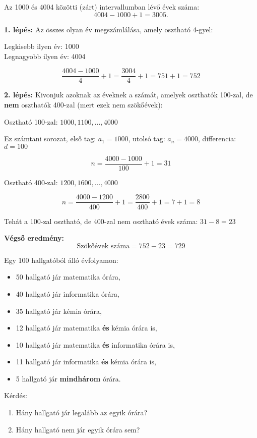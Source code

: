 \begin{solution}
Az 1000 és 4004 közötti (zárt) intervallumban lévő évek száma: 
\[
4004-1000+1=3005.
\]

\medskip{}

\textbf{1. lépés:} Az összes olyan év megszámlálása, amely osztható
4-gyel:

Legkisebb ilyen év: 1000 \\
 Legnagyobb ilyen év: 4004

\[
\frac{4004-1000}{4}+1=\frac{3004}{4}+1=751+1=752
\]

\textbf{2. lépés:} Kivonjuk azoknak az éveknek a számát, amelyek oszthatók
100-zal, de \textbf{nem} oszthatók 400-zal (mert ezek nem szökőévek):

Osztható 100-zal: $1000,1100,\dots,4000$

Ez számtani sorozat, első tag: $a_{1}=1000$, utolsó tag: $a_{n}=4000$,
differencia: $d=100$

\[
n=\frac{4000-1000}{100}+1=31
\]

Osztható 400-zal: $1200,1600,\dots,4000$

\[
n=\frac{4000-1200}{400}+1=\frac{2800}{400}+1=7+1=8
\]

Tehát a 100-zal osztható, de 400-zal nem osztható évek száma: $31-8=23$

\medskip{}

\textbf{Végső eredmény:} 
\[
\text{Szökőévek száma}=752-23=\boxed{729}
\]
\end{solution}
\begin{extraproblem}
Egy 100 hallgatóból álló évfolyamon:
\begin{itemize}
\item 50 hallgató jár matematika órára, 
\item 40 hallgató jár informatika órára, 
\item 35 hallgató jár kémia órára, 
\item 12 hallgató jár matematika \textbf{és} kémia órára is, 
\item 10 hallgató jár matematika \textbf{és} informatika órára is, 
\item 11 hallgató jár informatika \textbf{és} kémia órára is, 
\item 5 hallgató jár \textbf{mindhárom} órára. 
\end{itemize}
Kérdés:
\begin{enumerate}
\item Hány hallgató jár legalább az egyik órára? 
\item Hány hallgató nem jár egyik órára sem? 
\end{enumerate}
\end{extraproblem}

